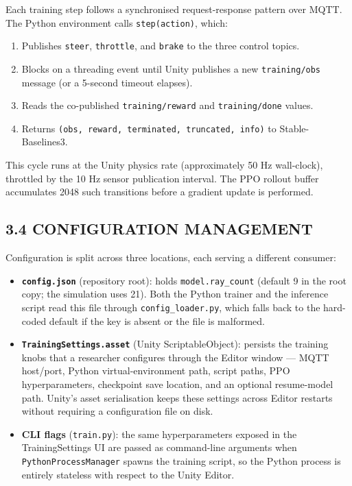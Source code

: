 \documentclass[12pt,a4paper]{article}
\begin{document}
\indent Each training step follows a synchronised request-response pattern over MQTT.
The Python environment calls \texttt{step(action)}, which:
\begin{enumerate}[leftmargin=2.5cm]
  \item Publishes \texttt{steer}, \texttt{throttle}, and \texttt{brake} to the
    three control topics.
  \item Blocks on a threading event until Unity publishes a new
    \texttt{training/obs} message (or a 5-second timeout elapses).
  \item Reads the co-published \texttt{training/reward} and
    \texttt{training/done} values.
  \item Returns \texttt{(obs, reward, terminated, truncated, info)} to
    Stable-Baselines3.
\end{enumerate}

This cycle runs at the Unity physics rate (approximately 50 Hz wall-clock),
throttled by the 10 Hz sensor publication interval. The PPO rollout buffer
accumulates 2048 such transitions before a gradient update is performed.

\subsection*{3.4 \quad CONFIGURATION MANAGEMENT}

\indent Configuration is split across three locations, each serving a different
consumer:

\begin{itemize}
  \item \textbf{\texttt{config.json}} (repository root): holds \texttt{model.ray\_count}
    (default 9 in the root copy; the simulation uses 21). Both the Python trainer
    and the inference script read this file through \texttt{config\_loader.py},
    which falls back to the hard-coded default if the key is absent or the file
    is malformed.
  \item \textbf{\texttt{TrainingSettings.asset}} (Unity ScriptableObject): persists
    the training knobs that a researcher configures through the Editor window ---
    MQTT host/port, Python virtual-environment path, script paths, PPO
    hyperparameters, checkpoint save location, and an optional resume-model path.
    Unity's asset serialisation keeps these settings across Editor restarts
    without requiring a configuration file on disk.
  \item \textbf{CLI flags} (\texttt{train.py}): the same hyperparameters exposed in
    the TrainingSettings UI are passed as command-line arguments when
    \texttt{PythonProcessManager} spawns the training script, so the Python
    process is entirely stateless with respect to the Unity Editor.
\end{itemize}
\end{document}
